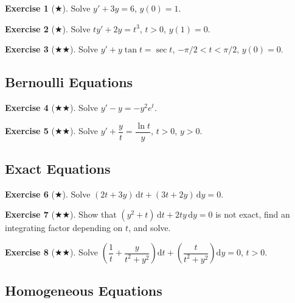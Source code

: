 \documentclass[12pt,a4paper,openany]{book}
\theoremstyle{definition}
\newtheorem{exercise}{Exercise}[chapter]
\theoremstyle{plain}
\theoremstyle{remark}
\newcommand{\dd}{\mathrm{d}}
\begin{document}
\begin{exercise}[$\bigstar$]
\label{exer:ch2-lin1}
Solve $y' + 3y = 6$, $y(0)=1$.
\end{exercise}

\begin{exercise}[$\bigstar$]
\label{exer:ch2-lin2}
Solve $ty' + 2y = t^3$, $t>0$, $y(1) = 0$.
\end{exercise}

\begin{exercise}[$\bigstar\bigstar$]
\label{exer:ch2-lin3}
Solve $y' + y\tan t = \sec t$, $-\pi/2 < t < \pi/2$, $y(0) = 0$.
\end{exercise}

\subsection*{Bernoulli Equations}

\begin{exercise}[$\bigstar\bigstar$]
\label{exer:ch2-ber1}
Solve $y' - y = -y^2 e^t$.
\end{exercise}

\begin{exercise}[$\bigstar\bigstar$]
\label{exer:ch2-ber2}
Solve $y' + \dfrac{y}{t} = \dfrac{\ln t}{y}$, $t > 0$, $y > 0$.
\end{exercise}

\subsection*{Exact Equations}

\begin{exercise}[$\bigstar$]
\label{exer:ch2-exact1}
Solve $(2t + 3y)\,\dd t + (3t + 2y)\,\dd y = 0$.
\end{exercise}

\begin{exercise}[$\bigstar\bigstar$]
\label{exer:ch2-exact2}
Show that $(y^2 + t)\,\dd t + 2ty\,\dd y = 0$ is not exact, find an integrating factor depending on $t$, and solve.
\end{exercise}

\begin{exercise}[$\bigstar\bigstar$]
\label{exer:ch2-exact3}
Solve $\left(\dfrac{1}{t} + \dfrac{y}{t^2+y^2}\right)\dd t + \left(\dfrac{t}{t^2+y^2}\right)\dd y = 0$, $t > 0$.
\end{exercise}

\subsection*{Homogeneous Equations}
\end{document}
